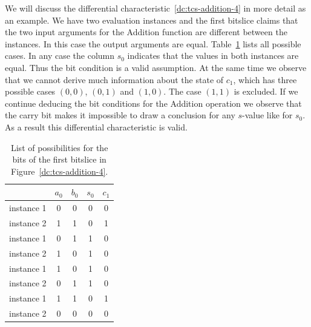 We will discuss the differential characteristic~\ref{dc:tcs-addition-4} in more detail as an example. We have two evaluation instances and the first bitslice claims that the two input arguments for the Addition function are different between the instances. In this case the output arguments are equal. Table~\ref{tab:tcs-addition-4-first-bitslice} lists all possible cases. In any case the column $s_0$ indicates that the values in both instances are equal. Thus the bit condition \bc{-} is a valid assumption. At the same time we observe that we cannot derive much information about the state of $c_1$, which has three possible cases $(0, 0)$, $(0, 1)$ and $(1, 0)$. The case $(1, 1)$ is excluded. If we continue deducing the bit conditions for the Addition operation we observe that the carry bit makes it impossible to draw a conclusion for any $s$-value like for $s_0$. As a result this differential characteristic is valid.

\begin{table}[t]
  \begin{center}
    \begin{tabular}{l|cccc}
     \hline \hline
                 & $a_0$ & $b_0$ & $s_0$ & $c_1$ \\
     \hline
      instance 1 &   0   &   0   &   0   &   0  \\
      instance 2 &   1   &   1   &   0   &   1  \\
     \hline
      instance 1 &   0   &   1   &   1   &   0  \\
      instance 2 &   1   &   0   &   1   &   0  \\
     \hline
      instance 1 &   1   &   0   &   1   &   0  \\
      instance 2 &   0   &   1   &   1   &   0  \\
     \hline
      instance 1 &   1   &   1   &   0   &   1  \\
      instance 2 &   0   &   0   &   0   &   0  \\
     \hline \hline
    \end{tabular}
    \caption{List of possibilities for the bits of the first bitslice in Figure~\ref{dc:tcs-addition-4}.}
    \label{tab:tcs-addition-4-first-bitslice}
  \end{center}
\end{table}


